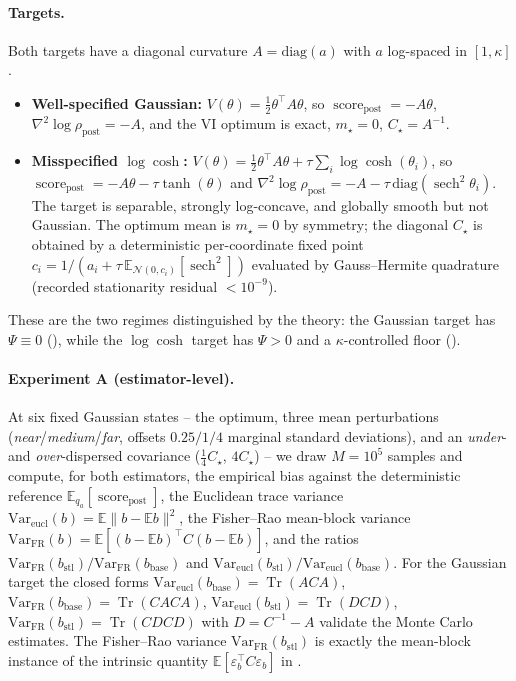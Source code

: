 \documentclass[11pt]{article}
\theoremstyle{plain}
\theoremstyle{definition}
\theoremstyle{remark}
\newcommand{\N}{\mathcal{N}}
\newcommand{\E}{\mathbb{E}}
\newcommand{\Tr}{\operatorname{Tr}}
\newcommand{\post}{\mathrm{post}}
\newcommand{\bbase}{b_{\mathrm{base}}}
\newcommand{\bstl}{b_{\mathrm{stl}}}
\newcommand{\score}{\operatorname{score}_\post}
\newcommand{\VarFR}{\mathrm{Var}_{\mathrm{FR}}}
\newcommand{\VarE}{\mathrm{Var}_{\mathrm{eucl}}}
\begin{document}
\paragraph{Targets.}
Both targets have a diagonal curvature $A=\mathrm{diag}(a)$ with $a$ log-spaced
in $[1,\kappa]$.
\begin{itemize}
\item \textbf{Well-specified Gaussian:} $V(\theta)=\tfrac12\theta^\top A\theta$,
so $\score=-A\theta$, $\nabla^2\log\rho_\post=-A$, and the VI optimum is exact,
$m_\star=0$, $C_\star=A^{-1}$.
\item \textbf{Misspecified $\log\cosh$:}
$V(\theta)=\tfrac12\theta^\top A\theta+\tau\sum_i\log\cosh(\theta_i)$, so
$\score=-A\theta-\tau\tanh(\theta)$ and
$\nabla^2\log\rho_\post=-A-\tau\,\mathrm{diag}(\operatorname{sech}^2\theta_i)$.
The target is separable, strongly log-concave, and globally smooth but not
Gaussian. The optimum mean is $m_\star=0$ by symmetry; the diagonal $C_\star$ is
obtained by a deterministic per-coordinate fixed point
$c_i=1/(a_i+\tau\,\E_{\N(0,c_i)}[\operatorname{sech}^2])$ evaluated by
Gauss--Hermite quadrature (recorded stationarity residual $<10^{-9}$).
\end{itemize}
These are the two regimes distinguished by the theory: the Gaussian target has
$\Psi\equiv0$ (), while the $\log\cosh$ target has $\Psi>0$ and a
$\kappa$-controlled floor ().

\paragraph{Experiment A (estimator-level).}
At six fixed Gaussian states -- the optimum, three mean perturbations
(\emph{near}/\emph{medium}/\emph{far}, offsets $0.25/1/4$ marginal standard
deviations), and an \emph{under}- and \emph{over}-dispersed covariance
($\tfrac14C_\star$, $4C_\star$) -- we draw $M=10^5$ samples and compute, for both
estimators, the empirical bias against the deterministic reference
$\E_{q_a}[\score]$, the Euclidean trace variance $\VarE(b)=\E\|b-\E b\|^2$, the
Fisher--Rao mean-block variance $\VarFR(b)=\E[(b-\E b)^\top C(b-\E b)]$, and the
ratios $\VarFR(\bstl)/\VarFR(\bbase)$ and $\VarE(\bstl)/\VarE(\bbase)$. For the
Gaussian target the closed forms $\VarE(\bbase)=\Tr(ACA)$,
$\VarFR(\bbase)=\Tr(CACA)$, $\VarE(\bstl)=\Tr(DCD)$, $\VarFR(\bstl)=\Tr(CDCD)$
with $D=C^{-1}-A$ validate the Monte Carlo estimates. The Fisher--Rao variance
$\VarFR(\bstl)$ is exactly the mean-block instance of the intrinsic quantity
$\E[\varepsilon_b^\top C\varepsilon_b]$ in .
\end{document}
